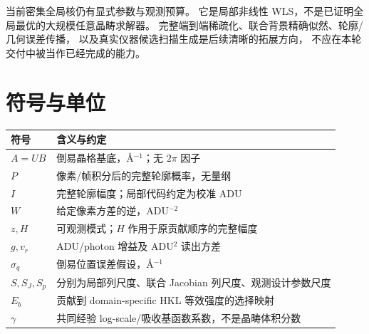 \documentclass[UTF8,11pt,a4paper,fontset=fandol]{ctexart}
\begin{document}
当前密集全局核仍有显式参数与观测预算。
它是局部非线性 WLS，不是已证明全局最优的大规模任意晶畴求解器。
完整端到端稀疏化、联合背景精确似然、轮廓/几何误差传播，
以及真实仪器候选扫描生成是后续清晰的拓展方向，
不应在本轮交付中被当作已经完成的能力。

\appendix
\section{符号与单位}
\noindent\begin{tabularx}{\textwidth}{@{}lX@{}}
\toprule
符号 & 含义与约定\\
\midrule
$A=UB$ & 倒易晶格基底，\AA$^{-1}$；无 $2\pi$ 因子\\
$P$ & 像素/帧积分后的完整轮廓概率，无量纲\\
$I$ & 完整轮廓幅度；局部代码约定为校准 ADU\\
$W$ & 给定像素方差的逆，ADU$^{-2}$\\
$z,H$ & 可观测模式；$H$ 作用于原贡献顺序的完整幅度\\
$g,v_r$ & ADU/photon 增益及 ADU$^2$ 读出方差\\
$\sigma_q$ & 倒易位置误差假设，\AA$^{-1}$\\
$S,S_J,S_p$ & 分别为局部列尺度、联合 Jacobian 列尺度、观测设计参数尺度\\
$E_b$ & 贡献到 domain-specific HKL 等效强度的选择映射\\
$\gamma$ & 共同经验 log-scale/吸收基函数系数，不是晶畴体积分数\\
\bottomrule
\end{tabularx}
\end{document}
